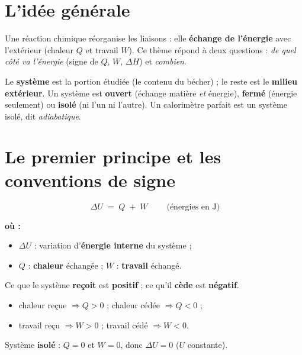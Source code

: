 \documentclass[11pt,a4paper]{article}
\newenvironment{ou}{\par\smallskip\noindent\textbf{où :}\nopagebreak\begin{itemize}[leftmargin=1.8em,topsep=2pt,itemsep=1.5pt,parsep=0pt]}{\end{itemize}}
\newcommand{\dH}{\Delta H}
\newcommand{\dU}{\Delta U}
\begin{document}
\begin{center}
\end{center}

\section{L'idée générale}
Une réaction chimique réorganise les liaisons : elle \textbf{échange de l'énergie} avec l'extérieur (chaleur
$Q$ et travail $W$). Ce thème répond à deux questions : \emph{de quel côté va l'énergie} (signe de $Q$, $W$, $\dH$) et \emph{combien}.

\begin{definitionb}
Le \textbf{système} est la portion étudiée (le contenu du bécher) ; le reste est le \textbf{milieu
extérieur}. Un système est \textbf{ouvert} (échange matière \emph{et} énergie), \textbf{fermé} (énergie
seulement) ou \textbf{isolé} (ni l'un ni l'autre). Un calorimètre parfait est un système isolé, dit
\emph{adiabatique}.
\end{definitionb}

\section{Le premier principe et les conventions de signe}

\begin{formuleb}
\[ \boxed{\;\dU \;=\; Q \;+\; W\;}\qquad\text{(énergies en }\si{\joule}\text{)} \]
\begin{ou}
  \item $\dU$ : variation d'\textbf{énergie interne} du système ;
  \item $Q$ : \textbf{chaleur} échangée ; \quad $W$ : \textbf{travail} échangé.
\end{ou}
\end{formuleb}

\begin{methodeb}
Ce que le système \textbf{reçoit} est \textbf{positif} ; ce qu'il \textbf{cède} est \textbf{négatif}.
\begin{itemize}[leftmargin=1.5em,topsep=1pt,itemsep=1pt]
  \item chaleur reçue $\Rightarrow Q>0$ \; ; \; chaleur cédée $\Rightarrow Q<0$ ;
  \item travail reçu $\Rightarrow W>0$ \; ; \; travail cédé $\Rightarrow W<0$.
\end{itemize}
Système \textbf{isolé} : $Q=0$ et $W=0$, donc $\dU=0$ ($U$ constante).
\end{methodeb}
\end{document}
